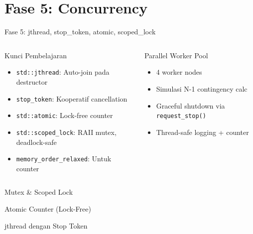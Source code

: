 \documentclass[aspectratio=169,10pt]{beamer}
\newcommand{\jthread}{\texttt{std::jthread}}
\newcommand{\atomic}{\texttt{std::atomic}}
\newcommand{\scopedlock}{\texttt{std::scoped\_lock}}
\begin{document}
\section{Fase 5: Concurrency}

\begin{frame}{Fase 5: jthread, stop\_token, atomic, scoped\_lock}
  \begin{columns}[T]
    \begin{block}{Kunci Pembelajaran}
      \begin{itemize}
        \item \jthread: Auto-join pada destructor
        \item \texttt{stop\_token}: Kooperatif cancellation
        \item \atomic: Lock-free counter
        \item \scopedlock: RAII mutex, deadlock-safe
        \item \texttt{memory\_order\_relaxed}: Untuk counter
      \end{itemize}
    \end{block}
    \begin{exampleblock}{Parallel Worker Pool}
      \begin{itemize}
        \item 4 worker nodes
        \item Simulasi N-1 contingency calc
        \item Graceful shutdown via \texttt{request\_stop()}
        \item Thread-safe logging + counter
      \end{itemize}
    \end{exampleblock}
  \end{columns}
\end{frame}

\begin{frame}[fragile]{Mutex \& Scoped Lock}
  
\end{frame}

\begin{frame}[fragile]{Atomic Counter (Lock-Free)}
  
\end{frame}

\begin{frame}[fragile]{jthread dengan Stop Token}
  
\end{frame}
\end{document}
